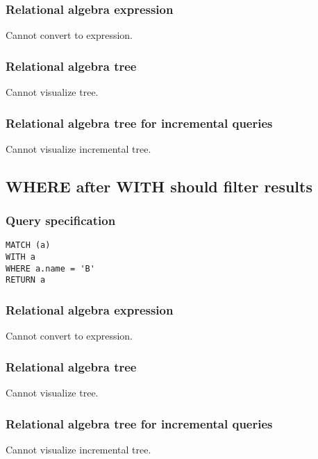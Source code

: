 \subsubsection*{Relational algebra expression}

Cannot convert to expression.

\subsubsection*{Relational algebra tree}

Cannot visualize tree.

\subsubsection*{Relational algebra tree for incremental queries}

Cannot visualize incremental tree.

\subsection{WHERE after WITH should filter results}

\subsubsection*{Query specification}

\begin{lstlisting}
MATCH (a)
WITH a
WHERE a.name = 'B'
RETURN a
\end{lstlisting}

\subsubsection*{Relational algebra expression}

Cannot convert to expression.

\subsubsection*{Relational algebra tree}

Cannot visualize tree.

\subsubsection*{Relational algebra tree for incremental queries}

Cannot visualize incremental tree.

